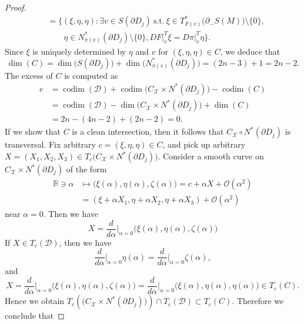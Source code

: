 \documentclass[10pt,a4paper]{amsart}
\begin{document}
\begin{proof}
\begin{align}
& =
  \bigl\{
  (\xi,\eta,\eta): 
  \exists v \in S({\partial}D_j)\ \text{s.t.}\  
  \xi \in T^\ast_{F(v)}\bigl(\partial_-S(M)\bigr)\setminus\{0\},
\nonumber
\\
& \qquad 
  \eta \in N^\ast_{\pi(v)}(\partial{D_j})\setminus\{0\},  
  DF\vert^T_v\xi=D\pi\vert^T_v\eta\bigr\}.
\label{equation:intersection4-1}
\end{align}
%
%
Since $\xi$ is uniquely determined by $\eta$ and $v$ for $(\xi,\eta,\eta) \in C$, we deduce that 
%
%
$$
\operatorname{dim}(C)
=
\operatorname{dim}\bigl(S(\partial{D}_j)\bigr)
+
\operatorname{dim}\bigl(N^\ast_{\pi(v)}(\partial{D_j})\bigr)
=
(2n-3)+1
=
2n-2.
$$
%
%
The excess of $C$ is computed as  
%
%
\begin{align*}
  e
& =
  \operatorname{codim}(\mathcal{D})
  +
  \operatorname{codim}\bigl(C_\mathcal{X}{\times}N^\ast(\partial{D_j})\bigr)
  -
  \operatorname{codim}(C)
\\
& =
  \operatorname{codim}(\mathcal{D})
  -
  \operatorname{dim}\bigl(C_\mathcal{X}{\times}N^\ast(\partial{D_j})\bigr)
  +
  \operatorname{dim}(C)
\\
& =
  2n-(4n-2)+(2n-2)
  =
  0. 
\end{align*} 
%
%
If we show that $C$ is a clean intersection, then it follows that $C_\mathcal{X}{\circ}N^\ast(\partial{D_j})$  is transversal. 
Fix arbitrary $c=(\xi,\eta,\eta) \in C$, and pick up arbitrary 
$X=(X_1,X_2,X_3) \in T_c\bigl(C_\mathcal{X}{\times}N^\ast(\partial{D_j})\bigr)$. Consider a smooth curve on 
$C_\mathcal{X}{\times}N^\ast(\partial{D_j})$ of the form 
%
%
\begin{align*}
  \mathbb{R}\ni\alpha 
& \mapsto 
  \bigl(\xi(\alpha),\eta(\alpha),\zeta(\alpha)\bigr)
  =
  c+\alpha{X}+\mathcal{O}(\alpha^2) 
\\
& =
  (\xi+\alpha{X}_1,\eta+\alpha{X}_2,\eta+\alpha{X}_3)+\mathcal{O}(\alpha^2)
\end{align*}
%
%
near $\alpha=0$. Then we have 
%
%
$$
X
=
\frac{d}{d\alpha}\bigg\vert_{\alpha=0}\bigl(\xi(\alpha),\eta(\alpha),\zeta(\alpha)\bigr)
$$
%
%
If $X \in T_c(\mathcal{D})$, then we have 
%
%
$$
\frac{d}{d\alpha}\bigg\vert_{\alpha=0}\eta(\alpha)
=
\frac{d}{d\alpha}\bigg\vert_{\alpha=0}\zeta(\alpha),
$$
%
%
and 
%
%
$$
X=
\frac{d}{d\alpha}\bigg\vert_{\alpha=0}\bigl(\xi(\alpha),\eta(\alpha),\zeta(\alpha)\bigr)
=
\frac{d}{d\alpha}\bigg\vert_{\alpha=0}\bigl(\xi(\alpha),\eta(\alpha),\eta(\alpha)\bigr)
\in 
T_c(C). 
$$
%
%
Hence we obtain $T_c(\bigl(C_\mathcal{X}{\times}N^\ast(\partial{D_j})\bigr)){\cap}T_c(\mathcal{D}){\subset}T_c(C)$. 
Therefore we conclude that 

\end{proof}
\end{document}
